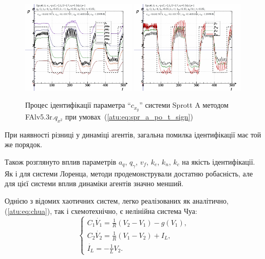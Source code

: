 \documentclass[a4paper,13pt]{atuaref}
\begin{document}
\begin{figure}[h!]
  \centerline{
    \includegraphics[width=0.49\textwidth]{p5/p/cha/spr_a/FAlv5.3A/sprott_a_FAlv5x3r-pl_n_sign.png}
    \hfill
    \includegraphics[width=0.49\textwidth]{p5/p/cha/spr_a/FAlv5.3A/sprott_a_FAlv5x3r-p_p_sign.png}
  }
  \caption{Процес ідентифікації параметра ``$c_{x_y}$'' системи Sprott A методом FAlv5.3r.$q_{x^2}$ при умовах~(\ref{atu:eq:spr_a_po_t_sign})}
  \label{atu:f:spr_a_id_FAlv5.3r.q_x2_sign}
\end{figure}

При наявності різниці у динаміці агентів, загальна помилка ідентифікації
має той же порядок.

Також розглянуто вплив параметрів $a_q$, $q_\gamma$, $v_f$, $k_e$, $k_n$, $k_c$
на якість ідентифікації. Як і для системи Лоренца, методи
продемонстрували достатню робасність, але для цієї системи
вплив динаміки агентів значно менший.

Однією з відомих хаотичних систем, легко реалізованих як аналітично,
(\ref{atu:eq:chua}), так і схемотехнічно, є нелінійна система Чуа:
%
\begin{equation}
\begin{cases}
  C_1 \dot{V_1}  = \frac{1}{R} ( V_2 - V_1 ) - g(V_1), \\
  C_2 \dot{V_2}  = \frac{1}{R} ( V_1 - V_2 ) + I_L, \\
  \dot{I_L}      = - \frac{1}{L} V_2 .
\end{cases}
\label{atu:eq:chua}
\end{equation}
\end{document}
